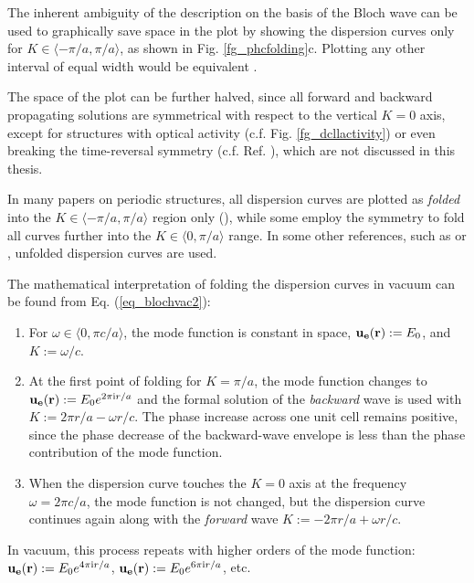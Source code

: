 \label{par_disp_curv_per}
The inherent ambiguity of the description on the basis of the Bloch wave can be used to graphically save space in the plot by showing the dispersion curves only for $K\in\langle-\pi/a, \pi/a\rangle$, as shown in Fig. \ref{fg_phcfolding}c. Plotting any other interval of equal width would be equivalent \cite[p. 177]{brillouin2003wave}. 

The space of the plot can be further halved, since all forward and backward propagating solutions are symmetrical with respect to the vertical $K=0$ axis, except for structures with optical activity (c.f. Fig. \ref{fg_dcllactivity}) or even breaking the time-reversal symmetry (c.f. Ref. \cite{vanwolleghem2009unidirectional}), which are not discussed in this thesis. 

In many papers on periodic structures, all dispersion curves are plotted as \textit{folded} into the $K\in\langle -\pi/a, \pi/a\rangle$ region only (\cite{obrien2002photonic, yannopapas2005negative, chakrabarti2012magnetic}), while some employ the symmetry to fold  all curves further into the $K\in\langle0, \pi/a\rangle$ range. %
In some other references, such as \cite{mortensen2010unambiguous} or \cite{yeh1977electromagnetic}, unfolded dispersion curves are used.

The mathematical interpretation of folding the dispersion curves in vacuum can be found from Eq. (\ref{eq_blochvac2}): 
\begin{enumerate}
\item{
For  $\omega\in\langle 0, \pi c /a\rangle$, the mode function is constant in space, $\mathbf{u_e}({\mathbf{r}}) := E_0$, and $K := \omega/c$. 
} 
\item{
At the first point of folding for $K=\pi/a$, the mode function changes to $\mathbf{u_e}({\mathbf{r}}) := E_0 e^{2\pi{\mathrm i} r/a}$ and the formal solution of the \textit{backward} wave is used with $K := 2\pi r/a - \omega r/c$.  The phase increase across one unit cell remains positive, since the phase decrease of the backward-wave envelope is less than the phase contribution of the mode function.
} 
\item{
When the dispersion curve touches the $K=0$ axis at the frequency $\omega = 2\pi c/a$, the mode function is not changed, but the dispersion curve continues again along with the \textit{forward} wave $K := - 2\pi r/a + \omega r/c$. 
} 
 \end{enumerate}
In vacuum, this process repeats with higher orders of the mode function: $\mathbf{u_e}({\mathbf{r}}) := E_0 e^{4\pi{\mathrm i} r/a}$, $\mathbf{u_e}({\mathbf{r}}) := E_0 e^{6\pi{\mathrm i} r/a}$, etc.

